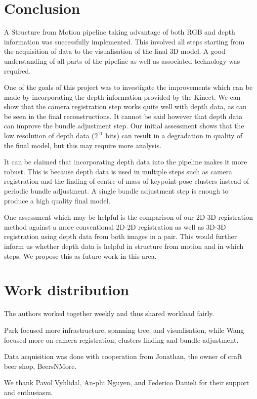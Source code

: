 \documentclass[10pt,twocolumn,letterpaper]{article}
\begin{document}

\section{Conclusion}

A Structure from Motion pipeline taking advantage of both RGB and depth
information was successfully implemented. This involved all steps starting
from the acquisition of data to the visualisation of the final 3D model. A
good understanding of all parts of the pipeline as well as associated technology
was required.

One of the goals of this project was to investigate the improvements which can
be made by incorporating the depth information provided by the Kinect. We can
show that the camera registration step works quite well with depth data, as can
be seen in the final reconstructions. It cannot be said however that depth data
can improve the bundle adjustment step. Our initial assessment shows that the
low resolution of depth data ($2^{11}$ bits) can result in a degradation in
quality of the final model, but this may require more analysis.

It can be claimed that incorporating depth data into the pipeline makes it more
robust. This is because depth data is used in multiple steps such as camera
registration and the finding of centre-of-mass of keypoint pose clusters instead
of periodic bundle adjustment. A single bundle adjustment step is enough to
produce a high quality final model.

One assessment which may be helpful is the comparison of our 2D-3D registration
method against a more conventional 2D-2D registration as well as 3D-3D
registration using depth data from both images in a pair. This would further
inform us whether depth data is helpful in structure from motion and in which
steps. We propose this as future work in this area.



\section*{Work distribution}

The authors worked together weekly and thus shared workload fairly.

Park focused more infrastructure, spanning tree, and visualisation, while Wang
focused more on camera registration, clusters finding and bundle adjustment.

Data acquisition was done with cooperation from Jonathan, the owner of craft
beer shop, BeersNMore.

We thank Pavol Vyhlidal, An-phi Nguyen, and Federico Danieli for their support
and enthusiasm.



{\small


}
\end{document}
